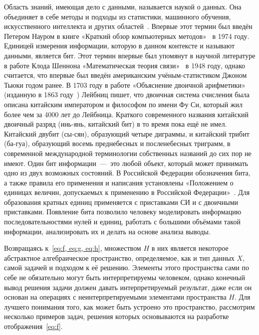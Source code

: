 Область знаний, имеющая дело с данными, называется наукой о данных. Она объединяет в себе методы и подходы из статистики, машинного обучения, искусственного интеллекта и других областей~\cite{cao, holland, isachenko}. Впервые этот термин был введён Петером Науром в книге «Краткий обзор компьютерных методов»~\cite{naur} в 1974 году. Единицей измерения информации, которую в данном контексте и называют данными, является бит. Этот термин впервые был упомянут в научной литературе в работе Клода Шеннона «Математическая теория связи»~\cite{shannon} в 1948 году, однако считается, что впервые был введён американским учёным-статистиком Джоном Тьюки годом ранее. В 1703 году в работе «Объяснение двоичной арифметики» (изданную в 1863 году~\cite{leibniz}) Лейбниц пишет, что двоичная система счисления была описана китайским императором и философом по имени Фу Си, который жил более чем за 4000 лет до Лейбница. Краткого современного названия китайский двоичный разряд (инь-янь, китайский бит) в то время пока ещё не имел. Китайский двубит (сы-сян), образующий четыре диграммы, и китайский трибит (ба-гуа), образующий восемь преднебесных и посленебесных триграмм, в современной международной терминологии собственных названий до сих пор не имеют. Один бит информации~---~это любой объект, который может принимать одно из двух возможных состояний. В Российской Федерации обозначения бита, а также правила его применения и написания установлены «Положением о единицах величин, допускаемых к применению в Российской Федерации»~\cite{law}. Для образования кратных единиц применяется с приставками СИ и с двоичными приставками. Появление бита позволило человеку моделировать информацию последовательностями нулей и единиц, работать с большими объёмами такой информации, анализировать их и делать на основе анализа выводы.

Возвращаясь к~\cref{eq:f, eq:g, eq:h}, множеством $H$ в них является некоторое абстрактное алгебраическое пространство, определяемое, как и тип данных $X$, самой задачей и подходом к её решению. Элементы этого пространства сами по себе не обязательно могут быть интерпретируемы человеком, однако конечный вывод решения задачи должен давать интерпретируемый результат, даже если он основан на операциях с неинтерпретируемыми элементами пространства $H$. Для лучшего понимания того, как может быть устроено это пространство, рассмотрим несколько примеров задач, решения которых основываются на разработке отображения~\cref{eq:f}.


